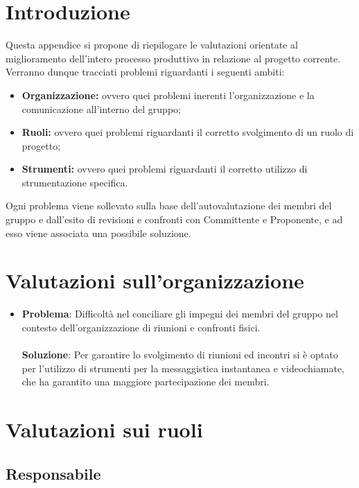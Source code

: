 \documentclass[openany,12pt,a4paper]{report}
\begin{document}
\section{Introduzione}

Questa appendice si propone di riepilogare le valutazioni orientate al miglioramento dell'intero processo produttivo in relazione al progetto corrente. Verranno dunque tracciati problemi riguardanti i seguenti ambiti:

\begin{itemize}
	\item \textbf{Organizzazione:} ovvero quei problemi inerenti l'organizzazione e la comunicazione all'interno del gruppo;
	\item \textbf{Ruoli:} ovvero quei problemi riguardanti il corretto svolgimento di un ruolo di progetto;
	\item \textbf{Strumenti:} ovvero quei problemi riguardanti il corretto utilizzo di strumentazione specifica.
\end{itemize}

\noindent Ogni problema viene sollevato sulla base dell'autovalutazione dei membri del gruppo e dall'esito di revisioni e confronti con Committente e Proponente, e ad esso viene associata una possibile soluzione.

\section{Valutazioni sull'organizzazione}
\begin{itemize}
	\item \textbf{Problema}: Difficoltà nel conciliare gli impegni dei membri del gruppo nel contesto dell'organizzazione di riunioni e confronti fisici. \\ \\
	\textbf{Soluzione}: Per garantire lo svolgimento di riunioni ed incontri si è optato per l'utilizzo di strumenti per la messaggistica instantanea e videochiamate, che ha garantito una maggiore partecipazione dei membri.
\end{itemize}

\section{Valutazioni sui ruoli}

\subsection{Responsabile}
\end{document}
